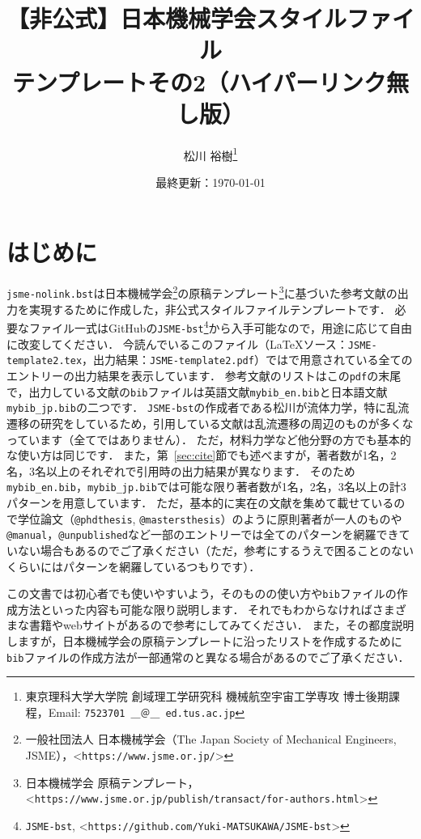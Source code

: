 \documentclass[a4paper,fleqn,uplatex,dvipdfmx]{jsarticle}
\title{【非公式】日本機械学会\BibTeX{}スタイルファイル \\ \JSMErepos テンプレートその2（ハイパーリンク無し版）}
\author{松川 裕樹\thanks{東京理科大学大学院 創域理工学研究科 機械航空宇宙工学専攻 博士後期課程，Email: \texttt{7523701 ＿＠＿ ed.tus.ac.jp}}}
\date{最終更新：\today}
\makeatletter
\newcommand{\jsmefile}{\texttt{jsme-nolink.bst}}
\newcommand{\JSMErepos}{\texttt{JSME-bst}}
\newcommand{\ttmanual}{\texttt{@manual}}
\newcommand{\ttmastersthesis}{\texttt{@mastersthesis}}
\newcommand{\ttphdthesis}{\texttt{@phdthesis}}
\newcommand{\ttunpublished}{\texttt{@unpublished}}
\makeatother
\begin{document}
\maketitle
\thispagestyle{cover}

\vspace{-5mm}
\tableofcontents

\section{はじめに}
\label{sec:introduction}
\jsmefile は日本機械学会\footnote{一般社団法人 日本機械学会（The Japan Society of Mechanical Engineers, JSME），\textless\verb|https://www.jsme.or.jp/|\textgreater}の原稿テンプレート\footnote{日本機械学会 原稿テンプレート，\textless\verb|https://www.jsme.or.jp/publish/transact/for-authors.html|\textgreater}に基づいた参考文献の出力を実現するために作成した，非公式\BibTeX{}スタイルファイルテンプレートです．
必要なファイル一式はGitHubの\JSMErepos\footnote{\JSMErepos, \textless\verb|https://github.com/Yuki-MATSUKAWA/JSME-bst|\textgreater}から入手可能なので，用途に応じて自由に改変してください．
今読んでいるこのファイル（\LaTeX{}ソース：\verb|JSME-template2.tex|，出力結果：\verb|JSME-template2.pdf|）では\BibTeX{}で用意されている全てのエントリーの出力結果を表示しています．
参考文献のリストはこの\verb|pdf|の末尾で，出力している文献の\verb|bib|ファイルは英語文献\verb|mybib_en.bib|と日本語文献\verb|mybib_jp.bib|の二つです．
\JSMErepos の作成者である松川が流体力学，特に乱流遷移の研究をしているため，引用している文献は乱流遷移の周辺のものが多くなっています（全てではありません）．
ただ，材料力学など他分野の方でも基本的な使い方は同じです．
また，第~\ref{sec:cite}節でも述べますが，著者数が1名，2名，3名以上のそれぞれで引用時の出力結果が異なります．
そのため\verb|mybib_en.bib|，\verb|mybib_jp.bib|では可能な限り著者数が1名，2名，3名以上の計3パターンを用意しています．
ただ，基本的に実在の文献を集めて載せているので学位論文（\ttphdthesis, \ttmastersthesis）のように原則著者が一人のものや\ttmanual，\ttunpublished など一部のエントリーでは全てのパターンを網羅できていない場合もあるのでご了承ください（ただ，参考にするうえで困ることのないくらいにはパターンを網羅しているつもりです）．

この文書では\BibTeX{}初心者でも使いやすいよう，\BibTeX{}そのものの使い方や\verb|bib|ファイルの作成方法といった内容も可能な限り説明します．
それでもわからなければさまざまな書籍やwebサイトがあるので参考にしてみてください．
また，その都度説明しますが，日本機械学会の原稿テンプレートに沿ったリストを作成するために\verb|bib|ファイルの作成方法が一部通常の\BibTeX{}と異なる場合があるのでご了承ください．
\end{document}
